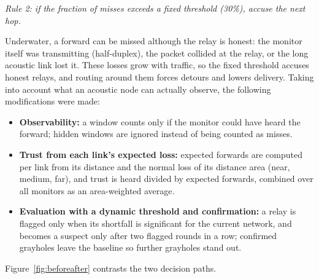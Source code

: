 \documentclass{article}
\begin{document}
\textit{Rule 2: if the fraction of misses exceeds a fixed threshold (30\%), accuse the next hop.}

Underwater, a forward can be missed although the relay is honest: the monitor itself was transmitting (half-duplex), the packet collided at the relay, or the long acoustic link lost it. These losses grow with traffic, so the fixed threshold accuses honest relays, and routing around them forces detours and lowers delivery. Taking into account what an acoustic node can actually observe, the following modifications were made:
\begin{itemize}
\item \textbf{Observability:} a window counts only if the monitor could have heard the forward; hidden windows are ignored instead of being counted as misses.
\item \textbf{Trust from each link's expected loss:} expected forwards are computed per link from its distance and the normal loss of its distance area (near, medium, far), and trust is heard divided by expected forwards, combined over all monitors as an area-weighted average.
\item \textbf{Evaluation with a dynamic threshold and confirmation:} a relay is flagged only when its shortfall is significant for the current network, and becomes a suspect only after two flagged rounds in a row; confirmed grayholes leave the baseline so further grayholes stand out.
\end{itemize}
Figure~\ref{fig:beforeafter} contrasts the two decision paths.
\end{document}
